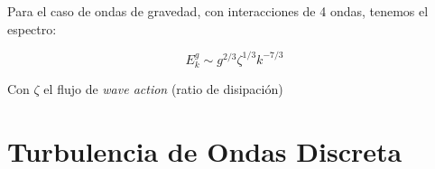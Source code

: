 Para el caso de ondas de gravedad, con interacciones de 4 ondas, tenemos el espectro:

\begin{equation}
	E^g_k \sim g^{2/3} \zeta^{1/3} k^{-7/3}
\end{equation}

Con $\zeta$ el flujo de \textit{wave action} (ratio de disipación)



\section{Turbulencia de Ondas Discreta}




















%
%
%
%

